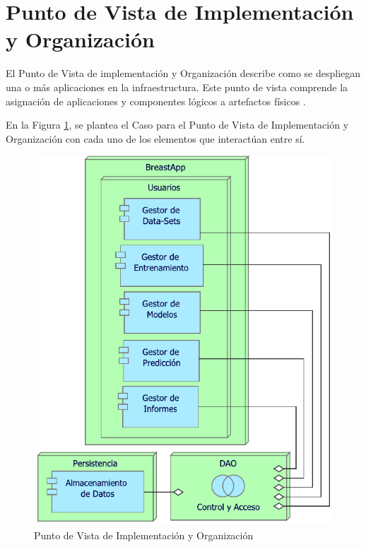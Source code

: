 \newpage
\section{Punto de Vista de Implementación y Organización}
El Punto de Vista de implementación y Organización describe como se despliegan una o más aplicaciones en la infraestructura. Este punto de vista comprende la asignación de aplicaciones y componentes lógicos a artefactos físicos \cite{BolanosCastro2019}.

En la Figura \ref{PvImpleOrg}, se plantea el Caso para el Punto de Vista de Implementación y Organización con cada uno de los elementos que interactúan entre sí. 

\begin{figure}[h!]
	\centering
	\includegraphics[width=0.65\linewidth]{ARQUITECTURA/imgs/CapaTecnologia/3_PvImplementacionOrganizacionTec}
	\caption{Punto de Vista de Implementación y Organización}
	\label{PvImpleOrg}
\end{figure}

